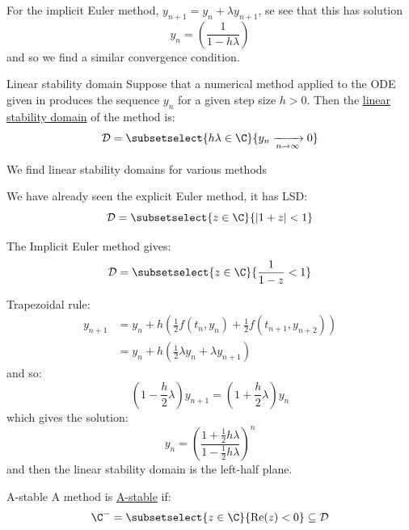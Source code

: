 \documentclass[../Main.tex]{subfiles}
\begin{document}
For the implicit Euler method, $y_{n + 1} = y_n + \lambda y_{n+1}$, se see that this has solution
\begin{equation*}
    y_n = \left(\frac{1}{1 - h \lambda}\right)
\end{equation*}
and so we find a similar convergence condition.
\begin{definition}{Linear stability domain}
    Suppose that a numerical method applied to the ODE given in  produces the sequence $y_n$ for a given step size $h > 0$. Then the \underline{linear stability domain} of the method is:
    \begin{equation*}
        \dom = \subsetselect{h\lambda \in \C}{y_n \xrightarrow[n \to \infty]{} 0}
    \end{equation*}
\end{definition}
\begin{examples}{
        We find linear stability domains for various methods
    }
    \item We have already seen the explicit Euler method, it has LSD:
        \begin{equation*}
            \dom = \subsetselect{z \in \C}{\abs{1 + z} < 1}
        \end{equation*}
    \item The Implicit Euler method gives:
        \begin{equation*}
            \dom = \subsetselect{z \in \C}{\frac{1}{1-z} < 1}
        \end{equation*}
    \item Trapezoidal rule:
        \begin{align*}
            y_{n+1} &= y_n + h \left(\frac{1}{2} f(t_n, y_n) + \frac12 f(t_{n+1}, y_{n+2})\right) \\
            &= y_n + h (\frac12 \lambda y_n + \lambda y_{n+1})
        \end{align*}
        and so:
        \begin{equation*}
            \left(1 - \frac{h}{2} \lambda\right) y_{n+1} = \left(1 + \frac{h}{2} \lambda\right) y_n
        \end{equation*}
        which gives the solution:
        \begin{equation*}
            y_n = \left(\frac{1 + \frac12 h \lambda}{1 - \frac12 h \lambda}\right)^n
        \end{equation*}
        and then the linear stability domain is the left-half plane.
\end{examples}
\begin{definition}{A-stable}
    A method is \underline{A-stable} if:
    \begin{equation*}
        \C^- = \subsetselect{z \in \C}{\Re(z) < 0} \subseteq \dom
    \end{equation*}
\end{definition}
\end{document}
